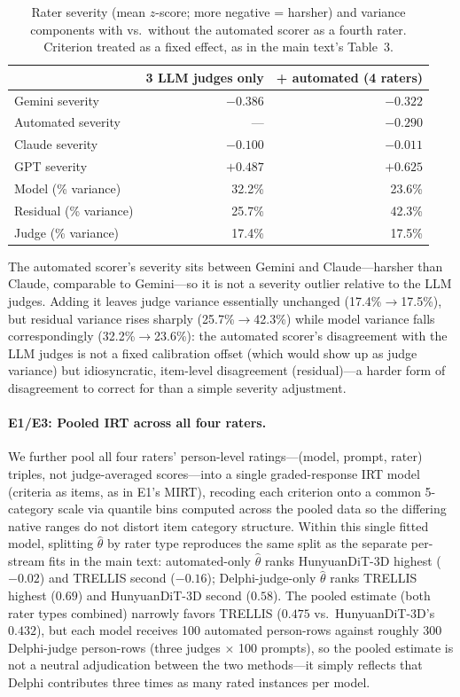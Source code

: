 \documentclass[10pt]{article}
\begin{document}
\begin{table}[H]
\centering
\small
\caption{Rater severity (mean $z$-score; more negative = harsher) and
variance components with vs.\ without the automated scorer as a fourth
rater. Criterion treated as a fixed effect, as in the main text's Table~3.}
\label{tab:rater_severity}
\begin{tabular}{lrr}
\toprule
& 3 LLM judges only & + automated (4 raters) \\
\midrule
Gemini severity     & $-0.386$ & $-0.322$ \\
Automated severity   & --- & $-0.290$ \\
Claude severity      & $-0.100$ & $-0.011$ \\
GPT severity         & $+0.487$ & $+0.625$ \\
\midrule
Model (\% variance)  & 32.2\% & 23.6\% \\
Residual (\% variance) & 25.7\% & 42.3\% \\
Judge (\% variance)  & 17.4\% & 17.5\% \\
\bottomrule
\end{tabular}
\end{table}

The automated scorer's severity sits between Gemini and Claude---harsher
than Claude, comparable to Gemini---so it is not a severity outlier
relative to the LLM judges. Adding it leaves judge variance essentially
unchanged (17.4\%$\to$17.5\%), but residual variance rises sharply
(25.7\%$\to$42.3\%) while model variance falls correspondingly
(32.2\%$\to$23.6\%): the automated scorer's disagreement with the LLM
judges is not a fixed calibration offset (which would show up as judge
variance) but idiosyncratic, item-level disagreement (residual)---a harder
form of disagreement to correct for than a simple severity adjustment.

\paragraph{E1/E3: Pooled IRT across all four raters.}
We further pool all four raters' person-level ratings---(model, prompt,
rater) triples, not judge-averaged scores---into a single graded-response
IRT model (criteria as items, as in E1's MIRT), recoding each criterion
onto a common 5-category scale via quantile bins computed across the
pooled data so the differing native ranges do not distort item category
structure. Within this single fitted model, splitting $\hat\theta$ by
rater type reproduces the same split as the separate per-stream fits in
the main text: automated-only $\hat\theta$ ranks HunyuanDiT-3D highest
($-0.02$) and TRELLIS second ($-0.16$); Delphi-judge-only $\hat\theta$
ranks TRELLIS highest ($0.69$) and HunyuanDiT-3D second ($0.58$). The
pooled estimate (both rater types combined) narrowly favors TRELLIS
($0.475$ vs.\ HunyuanDiT-3D's $0.432$), but each model receives 100
automated person-rows against roughly 300 Delphi-judge person-rows (three
judges $\times$ 100 prompts), so the pooled estimate is not a neutral
adjudication between the two methods---it simply reflects that Delphi
contributes three times as many rated instances per model.
\end{document}
